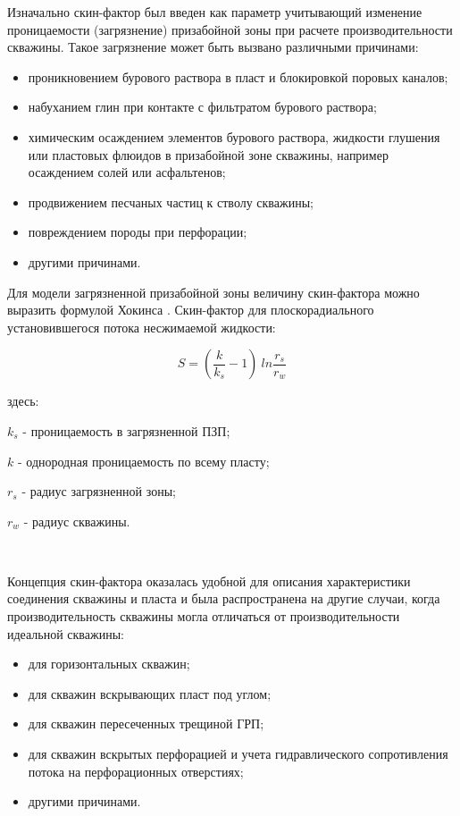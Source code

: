 Изначально скин-фактор был введен как параметр учитывающий изменение проницаемости (загрязнение) призабойной зоны при расчете производительности скважины. Такое загрязнение может быть вызвано различными причинами:
\begin{itemize}
	\item проникновением бурового раствора в пласт и блокировкой поровых каналов;
	\item набуханием глин при контакте с фильтратом бурового раствора;
	\item химическим осаждением элементов бурового раствора, жидкости глушения или пластовых флюидов в призабойной зоне скважины, например осаждением солей или асфальтенов;
	\item продвижением песчаных частиц к стволу скважины;
	\item повреждением породы при перфорации;
	\item другими причинами.
\end{itemize}	

Для модели загрязненной призабойной зоны величину скин-фактора можно выразить формулой Хокинса \cite{Hawkins_1956}. Скин-фактор для плоскорадиального установившегося потока несжимаемой жидкости:

\begin{equation} \label{eq:skin_hokins}
S =\left( \frac{k}{k_s} -1\right)\ ln\frac{r_s}{r_w}
\end{equation}

здесь:

$k_s$ - проницаемость в загрязненной ПЗП;

$k$ - однородная проницаемость по всему пласту;

$r_s$ - радиус загрязненной зоны;

$r_w$ - радиус скважины.

\

Концепция скин-фактора оказалась удобной для описания характеристики соединения скважины и пласта и была распространена на другие случаи, когда производительность скважины могла отличаться от производительности идеальной скважины:
\begin{itemize}
	\item для горизонтальных скважин;
	\item для скважин вскрывающих пласт под углом;
	\item для скважин пересеченных трещиной ГРП;
	\item для скважин вскрытых перфорацией и учета гидравлического сопротивления потока на перфорационных отверстиях;
	\item другими причинами.
\end{itemize}

